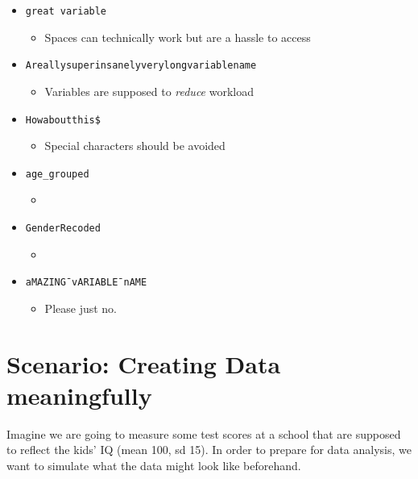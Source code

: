 \documentclass[
]{book}
\providecommand{\tightlist}{%
  \setlength{\itemsep}{0pt}\setlength{\parskip}{0pt}}
\begin{document}
\begin{itemize}
\tightlist
\item
  \texttt{great\ variable}

  \begin{itemize}
  \tightlist
  \item
    Spaces can technically work but are a hassle to access
  \end{itemize}
\item
  \texttt{Areallysuperinsanelyverylongvariablename}

  \begin{itemize}
  \tightlist
  \item
    Variables are supposed to \emph{reduce} workload
  \end{itemize}
\item
  \texttt{Howaboutthis\$}

  \begin{itemize}
  \tightlist
  \item
    Special characters should be avoided
  \end{itemize}
\item
  \texttt{age\_grouped}

  \begin{itemize}
  \tightlist
  \item
  \end{itemize}
\item
  \texttt{GenderRecoded}

  \begin{itemize}
  \tightlist
  \item
  \end{itemize}
\item
  \texttt{aMAZING¯vARIABLE¯nAME}

  \begin{itemize}
  \tightlist
  \item
    Please just no.
  \end{itemize}
\end{itemize}

\section{Scenario: Creating Data meaningfully}\label{scenario-creating-data-meaningfully}

Imagine we are going to measure some test scores at a school that are supposed to reflect the kids' IQ (mean 100, sd 15).
In order to prepare for data analysis, we want to simulate what the data might look like beforehand.
\end{document}
